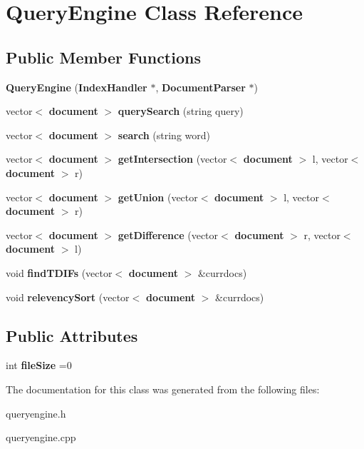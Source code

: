 \section{Query\+Engine Class Reference}
\label{class_query_engine}
\subsection*{Public Member Functions}
\begin{DoxyCompactItemize}
\item 
{\bfseries Query\+Engine} ({\bf Index\+Handler} $\ast$, {\bf Document\+Parser} $\ast$)\label{class_query_engine_a4f10c7d88f75039ac139209ad60c4867}

\item 
vector$<$ {\bf document} $>$ {\bfseries query\+Search} (string query)\label{class_query_engine_aea1c3b1b81ab4755bb9450c73080ba58}

\item 
vector$<$ {\bf document} $>$ {\bfseries search} (string word)\label{class_query_engine_a1a9e0cf429284793b690db04de09fd5f}

\item 
vector$<$ {\bf document} $>$ {\bfseries get\+Intersection} (vector$<$ {\bf document} $>$ l, vector$<$ {\bf document} $>$ r)\label{class_query_engine_a5acd0880e616f8a0c4e126294fe516b8}

\item 
vector$<$ {\bf document} $>$ {\bfseries get\+Union} (vector$<$ {\bf document} $>$ l, vector$<$ {\bf document} $>$ r)\label{class_query_engine_aee8574303264380c75ef2e02b0f76acf}

\item 
vector$<$ {\bf document} $>$ {\bfseries get\+Difference} (vector$<$ {\bf document} $>$ r, vector$<$ {\bf document} $>$ l)\label{class_query_engine_a57ef6547912ba509e2589b7b6cfe0d93}

\item 
void {\bfseries find\+T\+D\+I\+Fs} (vector$<$ {\bf document} $>$ \&currdocs)\label{class_query_engine_a8f580bd2a38cc08c68a2845f380d9547}

\item 
void {\bfseries relevency\+Sort} (vector$<$ {\bf document} $>$ \&currdocs)\label{class_query_engine_a11f70f58daaaa7dee67e52cc415bd13f}

\end{DoxyCompactItemize}
\subsection*{Public Attributes}
\begin{DoxyCompactItemize}
\item 
int {\bfseries file\+Size} =0\label{class_query_engine_a562077633097b8ccc4324df971ee23db}

\end{DoxyCompactItemize}


The documentation for this class was generated from the following files\+:\begin{DoxyCompactItemize}
\item 
queryengine.\+h\item 
queryengine.\+cpp\end{DoxyCompactItemize}
